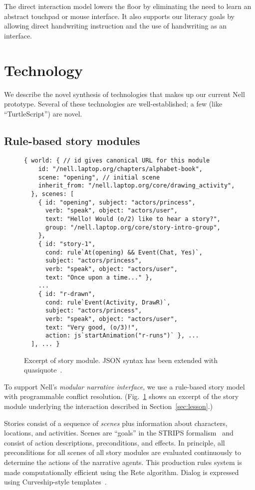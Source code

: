 \documentclass[preprint]{sig-alternate}
\begin{document}
The direct interaction model lowers the floor by eliminating the need
to learn an abstract touchpad or mouse interface.  It also supports
our literacy goals by allowing direct handwriting instruction and the
use of handwriting as an interface.

\section{Technology}
We describe the novel synthesis of technologies that makes up our current Nell
prototype. Several of these technologies are well-established; a few (like
``TurtleScript'') are novel.

\subsection{Rule-based story modules}
\begin{figure}\small
\begin{verbatim}
{ world: { // id gives canonical URL for this module
    id: "/nell.laptop.org/chapters/alphabet-book",
    scene: "opening", // initial scene
    inherit_from: "/nell.laptop.org/core/drawing_activity",
  }, scenes: [
    { id: "opening", subject: "actors/princess",
      verb: "speak", object: "actors/user",
      text: "Hello! Would (o/2) like to hear a story?",
      group: "/nell.laptop.org/core/story-intro-group",
    },
    { id: "story-1",
      cond: rule`At(opening) && Event(Chat, Yes)`,
      subject: "actors/princess",
      verb: "speak", object: "actors/user",
      text: "Once upon a time..." },
    ...
    { id: "r-drawn",
      cond: rule`Event(Activity, DrawR)`,
      subject: "actors/princess",
      verb: "speak", object: "actors/user",
      text: "Very good, (o/3)!",
      action: js`startAnimation("r-runs")` }, ...
  ], ... }
\end{verbatim}
\caption{Excerpt of story module.  JSON syntax has been extended with
quasiquote~\cite{quasiquote}.}\label{fig:rules}
\end{figure}
To support Nell's \textit{modular narrative interface}, we use a rule-based
story model with programmable conflict resolution. (Fig.~\ref{fig:rules} shows
an excerpt of the story module underlying the interaction described in
Section~\ref{sec:lesson}.)

Stories consist of a sequence of \textit{scenes} plus information about
characters, locations, and activities.  Scenes are ``goals''
in the STRIPS formalism~\cite{strips} and consist of
action descriptions, preconditions, and effects.
In principle, all preconditions for all scenes of all story modules
are evaluated continuously to determine the actions of the narrative
agents.  This production rules system
is made computationally efficient using the Rete
algorithm.  Dialog is expressed using Curveship-style
templates~\cite{montfort:curveship}.
\end{document}
